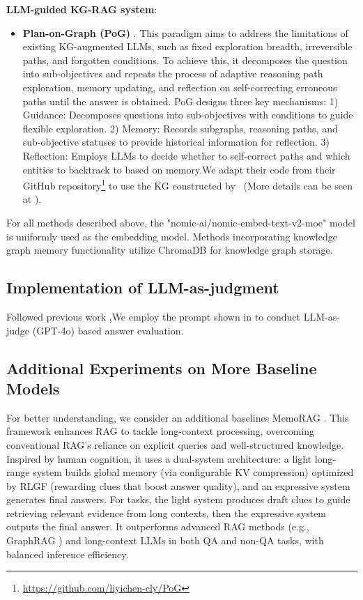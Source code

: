 \textbf{LLM-guided KG-RAG system}:
\begin{itemize}[leftmargin=*]
\item \textbf{Plan-on-Graph (PoG)} \cite{KG1}. This paradigm aims to address the limitations of existing KG-augmented LLMs, such as fixed exploration breadth, irreversible paths, and forgotten conditions. To achieve this, it decomposes the question into sub-objectives and repeats the process of adaptive reasoning path exploration, memory updating, and reflection on self-correcting erroneous paths until the answer is obtained. PoG designs three key mechanisms: 1) Guidance: Decomposes questions into sub-objectives with conditions to guide flexible exploration. 2) Memory: Records subgraphs, reasoning paths, and sub-objective statuses to provide historical information for reflection. 3) Reflection: Employs LLMs to decide whether to self-correct paths and which entities to backtrack to based on memory.We adapt their code from their GitHub repository\footnote{\url{https://github.com/liyichen-cly/PoG}} to use the KG constructed by \ours~(More details can be seen at ).

\end{itemize}

For all methods described above, the "nomic-ai/nomic-embed-text-v2-moe" model is uniformly used as the embedding model. Methods incorporating knowledge graph memory functionality utilize ChromaDB for knowledge graph storage.

\subsection{Implementation of LLM-as-judgment}
\label{appendix::answer-evaluation}

Followed previous work \cite{Benchmark1},We employ the prompt shown in  to conduct LLM-as-judge (GPT-4o) based answer evaluation.


\subsection{Additional Experiments on More Baseline Models}
\label{appendix::More Baseline Models}
For better understanding, we consider an additional baselines MemoRAG \cite{Main11}. This framework enhances RAG to tackle long-context processing, overcoming conventional RAG’s reliance on explicit queries and well-structured knowledge. Inspired by human cognition, it uses a dual-system architecture: a light long-range system builds global memory (via configurable KV compression) optimized by RLGF (rewarding clues that boost answer quality), and an expressive system generates final answers. For tasks, the light system produces draft clues to guide retrieving relevant evidence from long contexts, then the expressive system outputs the final answer. It outperforms advanced RAG methods (e.g., GraphRAG \cite{Main3}) and long-context LLMs in both QA and non-QA tasks, with balanced inference efficiency.   


